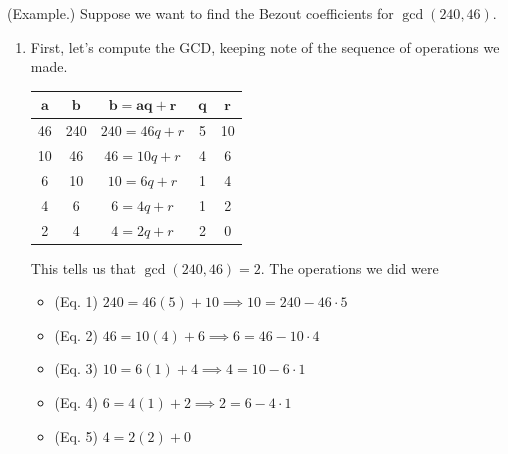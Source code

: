 \documentclass[letterpaper]{article}
\begin{document}
\begin{mdframed}
    (Example.) Suppose we want to find the Bezout coefficients for $\gcd(240, 46)$. 
    \begin{enumerate}
        \item First, let's compute the GCD, keeping note of the sequence of operations we made. 
        \begin{center}
            \begin{tabular}{|c|c|c|c|c|}
                \hline 
                $\mathbf{a}$ & $\mathbf{b}$ & $\mathbf{b = aq + r}$ & $\mathbf{q}$ & $\mathbf{r}$ \\ 
                \hline 
                46 & 240 & $240 = 46q + r$ & 5 & 10 \\ 
                10 & 46 & $46 = 10q + r$ & 4 & 6 \\ 
                6 & 10 & $10 = 6q + r$ & 1 & 4 \\ 
                4 & 6 & $6 = 4q + r$ & 1 & 2 \\ 
                2 & 4 & $4 = 2q + r$ & 2 & 0 \\
                \hline 
            \end{tabular}
        \end{center}
        This tells us that $\gcd(240, 46) = 2$. The operations we did were 
        \begin{itemize}
            \item (Eq. 1) $240 = 46(5) + 10 \implies 10 = 240 - 46 \cdot 5$
            \item (Eq. 2) $46 = 10(4) + 6 \implies 6 = 46 - 10 \cdot 4$
            \item (Eq. 3) $10 = 6(1) + 4 \implies 4 = 10 - 6 \cdot 1$
            \item (Eq. 4) $6 = 4(1) + 2 \implies 2 = 6 - 4 \cdot 1$
            \item (Eq. 5) $4 = 2(2) + 0$
        \end{itemize}


\end{enumerate}
\end{mdframed}
\end{document}
